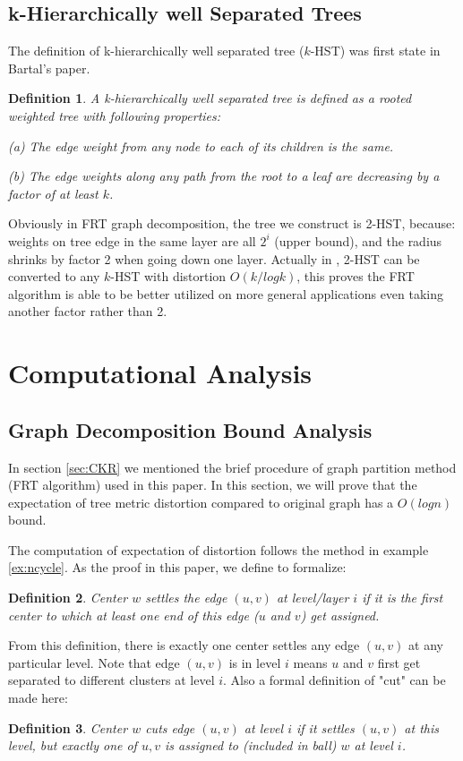 \documentclass[11pt,twocolumn]{IEEEtran}
\newtheorem{Definition}{Definition}[section]
\begin{document}
\subsection{k-Hierarchically well Separated Trees}
\label{sec:hst}
The definition of k-hierarchically well separated tree ($k$-HST) was first state in Bartal's paper\cite{hst}.
\begin{Definition}
A {\it k-hierarchically well separated tree} is defined as a rooted weighted tree with following properties:\par
(a) The edge weight from any node to each of its children is the same.\par
(b) The edge weights along any path from the root to a leaf are decreasing by a factor of at least $k$.
\end{Definition}
Obviously in FRT graph decomposition, the tree we construct is 2-HST, because: weights on tree edge in the
same layer are all $2^{i}$ (upper bound), and the radius shrinks by factor 2 when going down one layer.
Actually in \cite{bartal98}, 2-HST can be converted to any $k$-HST with distortion $O(k/logk)$, this
proves the FRT algorithm is able to be better utilized on more general applications 
even taking another factor rather than 2.

\section{Computational Analysis}
\subsection{Graph Decomposition Bound Analysis}
\label{sec:cutbound}
In section \ref{sec:CKR} we mentioned the brief procedure of graph partition method (FRT algorithm) used 
in this paper. In this section, we will prove that the expectation of tree metric distortion compared
to original graph has a $O(log n)$ bound.

The computation of expectation of distortion follows the method in example \ref{ex:ncycle}. As the proof
in this paper, we define to formalize:
\begin{Definition}
Center $w$ \emph{settles} the edge $(u,v)$ at level/layer $i$ if it is the first center to which at least one 
end of this edge ($u$ and $v$) get assigned.
\end{Definition}

From this definition, there is exactly one center settles any edge $(u,v)$ at any particular level.
Note that edge $(u,v)$ is in level $i$ means $u$ and $v$ first get separated to different clusters at level $i$.
Also a formal definition of "cut" can be made here:
\begin{Definition}
Center $w$ \emph{cuts} edge $(u,v)$ at level $i$ if it settles $(u,v)$ at this level, but exactly one
of $u,v$ is assigned to (included in ball) $w$ at level $i$.
\end{Definition}
\end{document}
